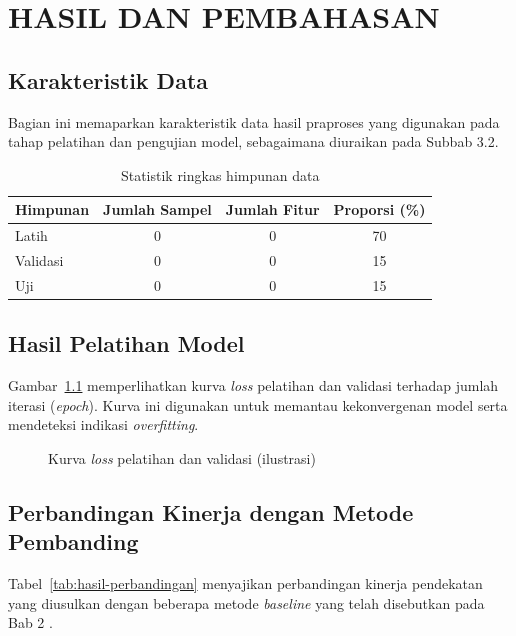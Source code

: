 \chapter{HASIL DAN PEMBAHASAN}

\section{Karakteristik Data}
Bagian ini memaparkan karakteristik data hasil praproses yang digunakan pada tahap pelatihan dan pengujian model, sebagaimana diuraikan pada Subbab 3.2.

\begin{table}[H]
\centering
\caption{Statistik ringkas himpunan data}
\label{tab:statistik-data}
\begin{tabular}{|l|c|c|c|}
\hline
Himpunan & Jumlah Sampel & Jumlah Fitur & Proporsi (\%) \\
\hline
Latih    & 0 & 0 & 70 \\
\hline
Validasi & 0 & 0 & 15 \\
\hline
Uji      & 0 & 0 & 15 \\
\hline
\end{tabular}
\end{table}

\section{Hasil Pelatihan Model}
Gambar~\ref{fig:kurva-pelatihan} memperlihatkan kurva \textit{loss} pelatihan dan validasi terhadap jumlah iterasi (\textit{epoch}). Kurva ini digunakan untuk memantau kekonvergenan model serta mendeteksi indikasi \textit{overfitting}.

\begin{figure}[H]
\centering
{}
\caption{Kurva \textit{loss} pelatihan dan validasi (ilustrasi)}
\label{fig:kurva-pelatihan}
\end{figure}

\section{Perbandingan Kinerja dengan Metode Pembanding}
Tabel~\ref{tab:hasil-perbandingan} menyajikan perbandingan kinerja pendekatan yang diusulkan dengan beberapa metode \textit{baseline} yang telah disebutkan pada Bab 2 \citep{russell2020,shukran2011}.

